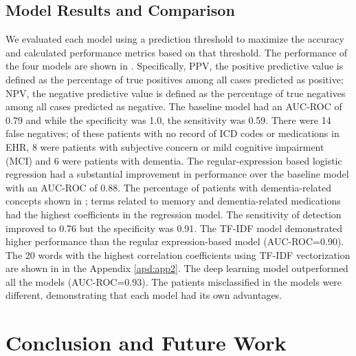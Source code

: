\documentclass[pmlr,twocolumn]{jmlr} %
\begin{document}
\subsection{Model Results and Comparison}
 We evaluated each model using a prediction threshold to maximize the accuracy and calculated performance metrics based on that threshold. The performance of the four models are shown in .  Specifically, PPV, the positive predictive value is defined as the percentage of true positives among all cases predicted as positive; NPV, the negative predictive value is defined as the percentage of true negatives among all cases predicted as negative. The baseline model had an AUC-ROC of 0.79 and while the specificity was 1.0, the sensitivity was 0.59. There were 14 false negatives; of these patients with no record of ICD codes or medications in EHR, 8 were patients with subjective concern or mild cognitive impairment (MCI) and 6 were patients with dementia. The regular-expression based logistic regression had a substantial improvement in performance over the baseline model with an AUC-ROC of 0.88. The percentage of patients with dementia-related concepts shown in ; terms related to memory and dementia-related medications had the highest coefficients in the regression model. The sensitivity of detection improved to 0.76 but the specificity was 0.91. The TF-IDF model demonstrated higher performance than the regular expression-based model (AUC-ROC=0.90). The 20 words with the highest correlation coefficients using TF-IDF vectorization are shown in   in the Appendix \ref{apd:app2}.  The deep learning model outperformed all the models (AUC-ROC=0.93). The patients misclassified in the models were different, demonstrating that each model had its own advantages. 
 

\section{Conclusion and Future Work}
\label{sec:conclusion}
\end{document}
